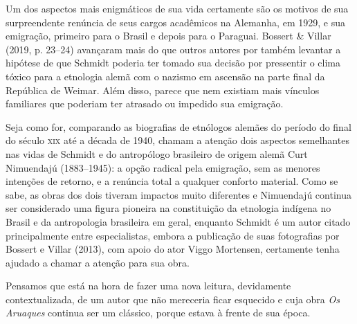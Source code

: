 Um dos aspectos mais enigmáticos de sua vida certamente são os motivos
de sua surpreendente renúncia de seus cargos acadêmicos na Alemanha, em
1929, e sua emigração, primeiro para o Brasil e depois para o Paraguai.
Bossert \& Villar (2019, p. 23--24) avançaram mais do que outros autores
por também levantar a hipótese de que Schmidt poderia ter tomado sua
decisão por pressentir o clima tóxico para a etnologia alemã com o
nazismo em ascensão na parte final da República de Weimar. Além disso,
parece que nem existiam mais vínculos familiares que poderiam ter
atrasado ou impedido sua emigração.

Seja como for, comparando as biografias de etnólogos alemães do período
do final do século \textsc{xix} até a década de 1940, chamam a atenção dois
aspectos semelhantes nas vidas de Schmidt e do antropólogo brasileiro de
origem alemã Curt Nimuendajú (1883--1945): a opção radical pela
emigração, sem as menores intenções de retorno, e a renúncia total a
qualquer conforto material. Como se sabe, as obras dos dois tiveram
impactos muito diferentes e Nimuendajú continua ser considerado uma
figura pioneira na constituição da etnologia indígena no Brasil e da
antropologia brasileira em geral, enquanto Schmidt é um autor citado
principalmente entre especialistas, embora a publicação de suas
fotografias por Bossert e Villar (2013), com apoio do ator Viggo
Mortensen, certamente tenha ajudado a chamar a atenção para sua obra.

Pensamos que está na hora de fazer uma nova leitura, devidamente
contextualizada, de um autor que não mereceria ficar esquecido e cuja
obra \emph{Os Aruaques} continua ser um clássico, porque estava à
frente de sua época.

